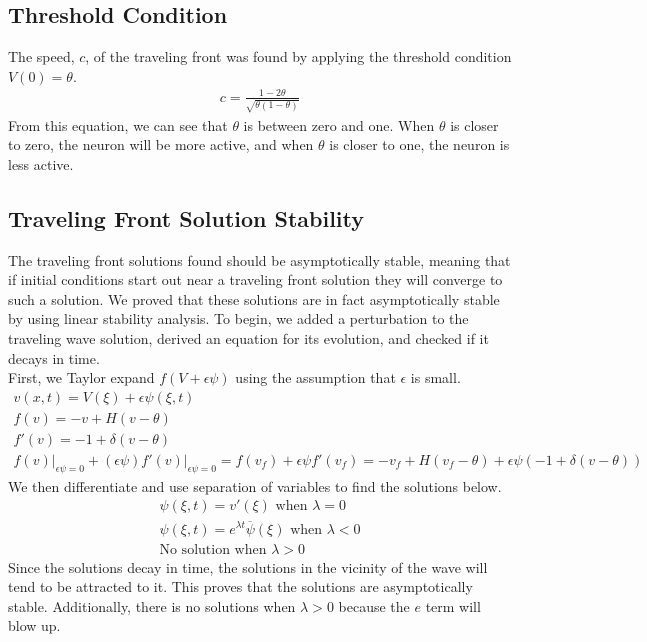 \documentclass{article}
\begin{document}
\subsection{Threshold Condition} 
The speed, $c$, of the traveling front was found by applying the threshold condition $V(0)=\theta$.
\begin{gather*} 
c=\frac{1-2\theta}{\sqrt{\theta(1-\theta)}}
\end{gather*}
From this equation, we can see that $\theta$ is between zero and one. When $\theta$ is closer to zero, the neuron will be more active, and when $\theta$ is closer to one, the neuron is less active. 
\subsection{Traveling Front Solution Stability}
The traveling front solutions found should be asymptotically stable, meaning that if initial conditions start out near a traveling front solution they will converge to such a solution. We proved that these solutions are in fact asymptotically stable by using linear stability analysis. To begin, we added a perturbation to the traveling wave solution, derived an equation for its evolution, and checked if it decays in time. \\
First, we Taylor expand $f(V+\epsilon\psi)$ using the assumption that $\epsilon$ is small.
\begin{gather*} 
v(x,t)=V(\xi)+\epsilon\psi(\xi,t)\\
f(v)=-v+H(v-\theta)\\
f'(v)=-1+\delta(v-\theta)\\
f(v)\Big|_{\epsilon\psi=0}+(\epsilon\psi)f'(v)\Big|_{\epsilon\psi=0}=f(v_f)+\epsilon\psi f'(v_f)=-v_f+H(v_f-\theta)+\epsilon\psi(-1+\delta(v-\theta))
\end{gather*}
We then differentiate and use separation of variables to find the solutions below.
\begin{gather*}
\psi(\xi,t)=v'(\xi)\textrm{ when }\lambda=0\\
\psi(\xi,t)=e^{\lambda t}\overline{\psi}(\xi)\textrm{ when }\lambda<0\\
\textrm{No solution when }\lambda>0
\end{gather*}
Since the solutions decay in time, the solutions in the vicinity of the wave will tend to be attracted to it. This proves that the solutions are asymptotically stable. Additionally, there is no solutions when $\lambda>0$ because the $e$ term will blow up.
\end{document}
